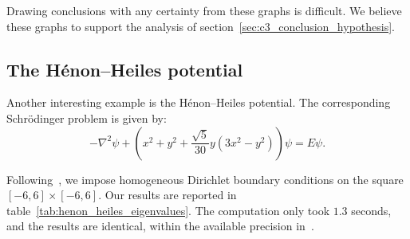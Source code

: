 Drawing conclusions with any certainty from these graphs is difficult. We believe these graphs to support the analysis of section~\ref{sec:c3_conclusion_hypothesis}.

\subsection{The Hénon--Heiles potential}\label{sec:c3_experiment_henon}

Another interesting example is the Hénon--Heiles potential. The corresponding Schrödinger problem is given by:
$$
  -\nabla^2 \psi + \left(x^2 + y^2 + \frac{\sqrt{5}}{30} y \left(3 x^2  - y^2\right)\right)\psi = E \psi \text{.}
$$

Following~\cite{braun_efficient_1996}, we impose homogeneous Dirichlet boundary conditions on the square $[-6, 6] \times [-6, 6]$. Our results are reported in table~\ref{tab:henon_heiles_eigenvalues}. The computation only took $1.3$ seconds, and the results are identical, within the available precision in~\cite{braun_efficient_1996}.


